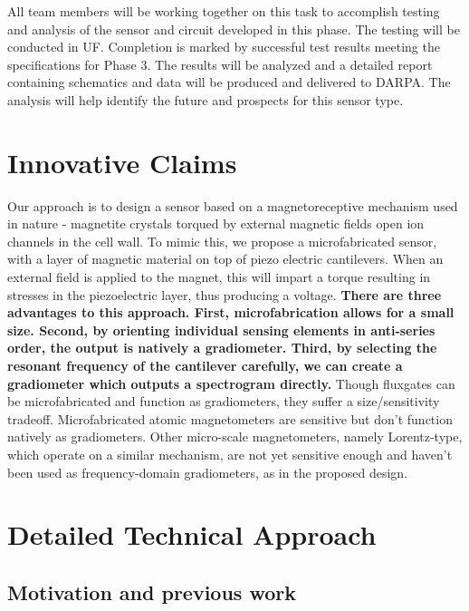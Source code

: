 All team members will be working together on this task to accomplish testing and analysis of the sensor and circuit developed in this phase. The testing will be conducted in UF. Completion is marked by successful test results meeting the specifications for Phase 3. The results will be analyzed and a detailed report containing schematics and data will be produced and delivered to DARPA. The analysis will help identify the future and prospects for this sensor type.

\section{Innovative Claims}\label{sec:inno}

Our approach is to design a sensor based on a magnetoreceptive mechanism used in nature - magnetite crystals torqued by external magnetic fields open ion channels in the cell wall. To mimic this, we propose a microfabricated sensor, with a layer of magnetic material on top of piezo electric cantilevers. When an external field is applied to the magnet, this will impart a torque resulting in stresses in the piezoelectric layer, thus producing a voltage. \textbf{There are three advantages to this approach. First, microfabrication allows for a small size. Second, by orienting individual sensing elements in anti-series order, the output is natively a gradiometer. Third, by selecting the resonant frequency of the cantilever carefully, we can create a gradiometer which outputs a spectrogram directly.} Though fluxgates can be microfabricated and function as gradiometers, they suffer a size/sensitivity tradeoff. Microfabricated atomic magnetometers are sensitive but don't function natively as gradiometers. Other micro-scale magnetometers, namely Lorentz-type, which operate on a similar mechanism, are not yet sensitive enough and haven't been used as frequency-domain gradiometers, as in the proposed design.

\section{Detailed Technical Approach}

\subsection{Motivation and previous work}

